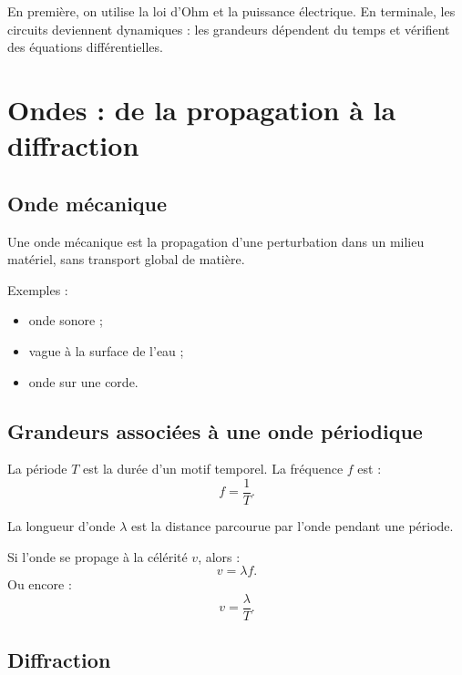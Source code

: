\documentclass[11pt,a4paper]{article}
\begin{document}
\begin{transition}
En première, on utilise la loi d'Ohm et la puissance électrique.  
En terminale, les circuits deviennent dynamiques : les grandeurs dépendent du temps et vérifient des équations différentielles.
\end{transition}

\section{Ondes : de la propagation à la diffraction}

\subsection{Onde mécanique}

\begin{definition}
Une onde mécanique est la propagation d'une perturbation dans un milieu matériel, sans transport global de matière.
\end{definition}

Exemples :
\begin{itemize}
  \item onde sonore ;
  \item vague à la surface de l'eau ;
  \item onde sur une corde.
\end{itemize}

\subsection{Grandeurs associées à une onde périodique}

\begin{definition}
La période $T$ est la durée d'un motif temporel.  
La fréquence $f$ est :
\[
f=\frac{1}{T}.
\]
\end{definition}

\begin{definition}
La longueur d'onde $\lambda$ est la distance parcourue par l'onde pendant une période.
\end{definition}

Si l'onde se propage à la célérité $v$, alors :
\[
v=\lambda f.
\]
Ou encore :
\[
v=\frac{\lambda}{T}.
\]

\subsection{Diffraction}
\end{document}
